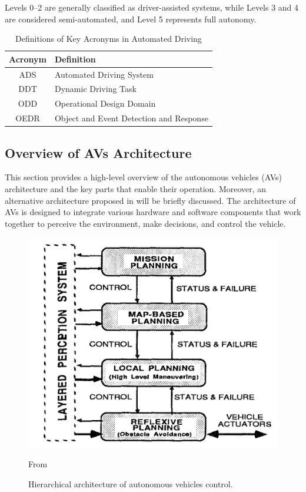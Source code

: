 Levels 0–2 are generally classified as driver-assisted systems, while Levels 3 and 4 are considered semi-automated, and Level 5 represents full autonomy.

\begin{table}[ht]
    \centering
    \begin{tabular}{|c|l|}
        \hline
        \textbf{Acronym} & \textbf{Definition} \\ \hline
        ADS & Automated Driving System \\ \hline
        DDT & Dynamic Driving Task \\ \hline
        ODD & Operational Design Domain \\ \hline
        OEDR & Object and Event Detection and Response \\ \hline
    \end{tabular}
    \caption{Definitions of Key Acronyms in Automated Driving}
    \label{tab:acronyms}
\end{table}

\subsection{Overview of AVs Architecture}\label{subsec:overview-on-avs-architecture}

This section provides a high-level overview of the autonomous vehicles (AVs) architecture and the key parts that enable their operation.
Moreover, an alternative architecture proposed in\cite{2023survey} will be briefly discussed.
The architecture of AVs is designed to integrate various hardware and software components that work together to perceive the environment, make decisions, and control the vehicle\cite{architecture}.

\begin{figure}[!htb]
    \centering
    \includegraphics[width=0.7\linewidth]{figures/state-architecture}
    \caption{Hierarchical architecture of autonomous vehicles control.}
    \footnotesize{From \cite{architecture} }
    \label{fig:architecture}
\end{figure}

